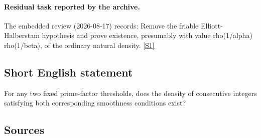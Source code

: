 \documentclass[11pt,a4paper]{article}
\newcommand{\sref}[2]{\hyperlink{source:#1:#2}{[S#2]}}
\begin{document}
\paragraph{Residual task reported by the archive.}

The embedded review (2026-08-17) records: Remove the friable Elliott-Halberstam hypothesis and prove existence, presumably with value rho(1/alpha) rho(1/beta), of the ordinary natural density. \sref{2384}{1}

\subsection{Short English statement}

For any two fixed prime-factor thresholds, does the density of consecutive integers satisfying both corresponding smoothness conditions exist?

\subsection{Sources}
\end{document}
